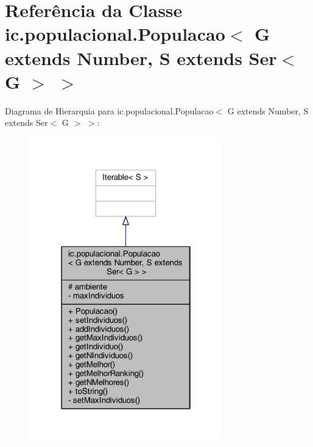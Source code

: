 \hypertarget{classic_1_1populacional_1_1_populacao_3_01_g_01extends_01_number_00_01_s_01extends_01_ser_3_01_g_01_4_01_4}{\section{Referência da Classe ic.\-populacional.\-Populacao$<$ G extends Number, S extends Ser$<$ G $>$ $>$}
\label{classic_1_1populacional_1_1_populacao_3_01_g_01extends_01_number_00_01_s_01extends_01_ser_3_01_g_01_4_01_4}
}


Diagrama de Hierarquia para ic.\-populacional.\-Populacao$<$ G extends Number, S extends Ser$<$ G $>$ $>$\-:\nopagebreak
\begin{figure}[H]
\begin{center}
\leavevmode
\includegraphics[width=238pt]{classic_1_1populacional_1_1_populacao_3_01_g_01extends_01_number_00_01_s_01extends_01_ser_3_01_g_01_4_01_4__inherit__graph}
\end{center}
\end{figure}


